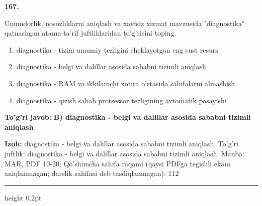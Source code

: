 \documentclass[10pt,a4paper]{article}
\begin{document}
{\bfseries\sffamily\color{ink} 167.}
\par
Unumdorlik, nosozliklarni aniqlash va xavfsiz xizmat mavzusida "diagnostika" qatnashgan atama-ta'rif juftliklaridan to'g'risini toping.
\begin{enumerate}[label=\Alph*),leftmargin=9mm]
\item diagnostika - tizim umumiy tezligini cheklayotgan eng sust resurs
\item diagnostika - belgi va dalillar asosida sababni tizimli aniqlash
\item diagnostika - RAM va ikkilamchi xotira o'rtasida sahifalarni almashish
\item diagnostika - qizish sabab protsessor tezligining avtomatik pasayishi
\end{enumerate}
\begin{tcolorbox}[enhanced,breakable,colback=teal!4,colframe=teal!60!black,boxrule=0.45pt,arc=1.2mm,left=2.7mm,right=2.7mm,top=1.8mm,bottom=1.8mm,before skip=2mm,after skip=2mm]
{\bfseries\sffamily\color{teal}To'g'ri javob:} \textbf{B) diagnostika - belgi va dalillar asosida sababni tizimli aniqlash}
\par\smallskip
{\bfseries Izoh:} diagnostika - belgi va dalillar asosida sababni tizimli aniqlash. To'g'ri juftlik: diagnostika - belgi va dalillar asosida sababni tizimli aniqlash. Manba: MAR, PDF 10-20; Qo'shimcha sahifa raqami (qaysi PDFga tegishli ekani aniqlanmagan; darslik sahifasi deb tasdiqlanmagan): 112
\end{tcolorbox}
\vspace{2mm}\hrule height 0.2pt\vspace{3mm}
\end{document}
